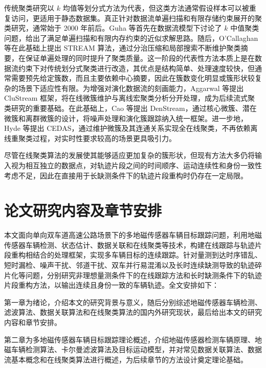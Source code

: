 \documentclass{xdupgthesis}
\begin{document}
传统聚类研究以 $k$ 均值等划分式方法为代表，但这类方法通常假设样本可以被重复访问，更适用于静态数据集\cite{macqueen1967some}。真正针对数据流单遍扫描和有限存储约束展开的聚类研究，通常始于 2000 年前后。Guha 等首先在数据流模型下讨论了 $k$ 中值聚类问题，给出了满足单遍扫描和有限内存约束的近似求解思路\cite{guha2000clustering}。随后，O'Callaghan 等在此基础上提出 STREAM 算法，通过分治压缩和局部搜索不断维护聚类摘要，在保证单遍处理的同时提升了聚类质量\cite{ocallaghan2002streaming}。这一阶段的代表性方法本质上是在数据流约束下对传统划分式聚类进行改造，其优点是结构简单、处理速度较快，但通常需要预先给定簇数，而且主要依赖中心摘要，因此在簇数变化明显或簇形状较复杂的场景下适应性有限。为增强对演化数据流的刻画能力，Aggarwal 等提出 CluStream 框架，将在线微簇维护与离线宏聚类分析分开处理，成为后续流式聚类研究的重要基础\cite{aggarwal2003framework}。在此基础上，Cao 等提出 DenStream，通过核心微簇、潜在微簇和离群微簇的设计，将噪声处理和演化簇跟踪纳入统一框架\cite{cao2006denstream}。进一步地，Hyde 等提出 CEDAS，通过维护微簇及其连通关系实现全在线聚类，不再依赖离线重聚类过程，对实时性要求较高的场景更具吸引力\cite{hyde2017cedas}。

尽管在线聚类算法的发展使其能够适应更加复杂的簇形状，但现有方法大多仍将输入视为相互独立的数据点，对轨迹片段之间的时间顺序、运动连续性和身份一致性考虑不足，因此在直接用于长缺测条件下的轨迹片段重构时仍存在一定局限。



\section{论文研究内容及章节安排}

本文面向单向双车道高速公路场景下的多地磁传感器车辆目标跟踪问题，利用地磁传感器车辆检测、状态估计、数据关联和在线聚类等技术，构建在线跟踪与轨迹片段重构相结合的处理框架，实现多车辆目标的连续跟踪。针对量测到达时序错乱、短时漏检、噪声干扰、邻道干扰、双车并行易混淆以及长时连续缺测导致的轨迹碎片化等问题，分别研究非理想量测条件下的在线跟踪方法和长时缺测条件下的轨迹片段重构方法，以输出连续且身份一致的车辆轨迹。全文安排如下：

第一章为绪论，介绍本文的研究背景与意义，随后分别综述地磁传感器车辆检测、滤波算法、数据关联算法和在线聚类算法的国内外研究现状，最后给出本文的研究内容和章节安排。

第二章为多地磁传感器车辆目标跟踪理论概述，介绍地磁传感器检测车辆原理、地磁车辆检测算法、卡尔曼滤波算法及目标运动模型，并对常见数据关联算法、数据流基本概念和在线聚类算法进行概述，为后续章节的方法设计奠定理论基础。
\end{document}

